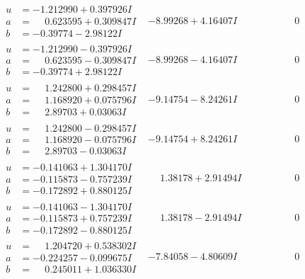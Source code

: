 \documentclass[1p]{elsarticle_modified}
\theoremstyle{definition}
\begin{document}
$$\begin{array}{c|c|c}
\begin{aligned}
u &= -1.212990 + 0.397926 I \\
a &= \phantom{-}0.623595 + 0.309847 I \\
b &= -0.39774 - 2.98122 I\end{aligned}
 & -8.99268 + 4.16407 I & \phantom{-0.000000 } 0 \\ \hline\begin{aligned}
u &= -1.212990 - 0.397926 I \\
a &= \phantom{-}0.623595 - 0.309847 I \\
b &= -0.39774 + 2.98122 I\end{aligned}
 & -8.99268 - 4.16407 I & \phantom{-0.000000 } 0 \\ \hline\begin{aligned}
u &= \phantom{-}1.242800 + 0.298457 I \\
a &= \phantom{-}1.168920 + 0.075796 I \\
b &= \phantom{-}2.89703 + 0.03063 I\end{aligned}
 & -9.14754 - 8.24261 I & \phantom{-0.000000 } 0 \\ \hline\begin{aligned}
u &= \phantom{-}1.242800 - 0.298457 I \\
a &= \phantom{-}1.168920 - 0.075796 I \\
b &= \phantom{-}2.89703 - 0.03063 I\end{aligned}
 & -9.14754 + 8.24261 I & \phantom{-0.000000 } 0 \\ \hline\begin{aligned}
u &= -0.141063 + 1.304170 I \\
a &= -0.115873 - 0.757239 I \\
b &= -0.172892 + 0.880125 I\end{aligned}
 & \phantom{-}1.38178 + 2.91494 I & \phantom{-0.000000 } 0 \\ \hline\begin{aligned}
u &= -0.141063 - 1.304170 I \\
a &= -0.115873 + 0.757239 I \\
b &= -0.172892 - 0.880125 I\end{aligned}
 & \phantom{-}1.38178 - 2.91494 I & \phantom{-0.000000 } 0 \\ \hline\begin{aligned}
u &= \phantom{-}1.204720 + 0.538302 I \\
a &= -0.224257 - 0.099675 I \\
b &= \phantom{-}0.245011 + 1.036330 I\end{aligned}
 & -7.84058 - 4.80609 I & \phantom{-0.000000 } 0 \\ \hline\begin{aligned}

\end{aligned}
\end{array}$$
\end{document}
